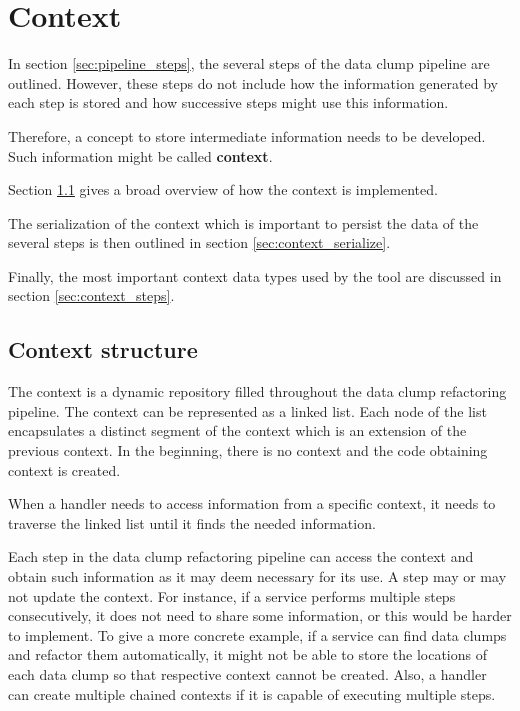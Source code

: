 \section{Context}\label{sec:context}
In section \ref{sec:pipeline_steps}, the several steps of the data clump pipeline are outlined. However, these steps do not include how the information generated by each step is stored and how successive steps might use this information.

Therefore, a concept to store intermediate information needs to be developed. Such information might be called \textbf{context}.


Section \ref{sec:context_structure} gives a broad overview of how the context is implemented.

The serialization of the context which is important to persist the data of the several steps is then outlined in section \ref{sec:context_serialize}.

Finally, the most important context data types used by the tool are discussed in section \ref{sec:context_steps}.

\subsection{Context structure}\label{sec:context_structure}
The context is a  dynamic repository filled throughout the data clump refactoring pipeline. The context can be represented as a linked list. Each node of the list encapsulates a distinct segment of the context which is an extension of the previous context. In the beginning, there is no context and the code obtaining context is created.

When a handler needs to access information from a specific context, it needs to traverse the linked list until it finds the needed information. 


Each step in the data clump refactoring pipeline can access the context and obtain such information as it may deem necessary for its use. A step may or may not update the context. For instance, if a service performs multiple steps consecutively, it does not need to share  some information, or this would be harder to implement. To give a more concrete example, if a service can find data clumps and refactor them automatically, it might not be able to store the locations of each data clump so that respective context cannot be created. Also, a handler can create multiple chained contexts if it is capable of executing multiple steps. 




